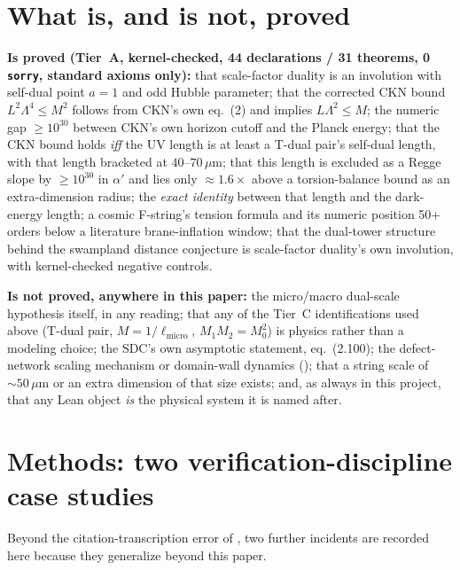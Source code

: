 \documentclass[11pt,a4paper]{article}
\theoremstyle{remark}
\begin{document}
\section{What is, and is not, proved}
\label{sec:scope}
\begin{scopebox}
\textbf{Is proved (Tier~A, kernel-checked, 44 declarations / 31 theorems, 0 \texttt{sorry},
standard axioms only):} that scale-factor duality is an involution with self-dual point $a=1$ and
odd Hubble parameter; that the corrected CKN bound $L^2\Lambda^4\le M^2$ follows from CKN's own
eq.~(2) and implies $L\Lambda^2\le M$; the numeric gap $\ge10^{30}$ between CKN's own horizon
cutoff and the Planck energy; that the CKN bound holds \emph{iff} the UV length is at least a
T-dual pair's self-dual length, with that length bracketed at $40$--$70\,\mu$m; that this length
is excluded as a Regge slope by $\ge10^{30}$ in $\alpha'$ and lies only $\approx1.6\times$ above a
torsion-balance bound as an extra-dimension radius; the \emph{exact identity} between that length
and the dark-energy length; a cosmic F-string's tension formula and its numeric position 50+ orders
below a literature brane-inflation window; that the dual-tower structure behind the swampland
distance conjecture is scale-factor duality's own involution, with kernel-checked negative
controls.

\textbf{Is not proved, anywhere in this paper:} the micro/macro dual-scale hypothesis itself, in
any reading; that any of the Tier~C identifications used above (T-dual pair, $M=1/\ell_{\mathrm{micro}}$,
$M_1M_2=M_0^2$) is physics rather than a modeling choice; the SDC's own asymptotic statement,
eq.~(2.100); the defect-network scaling mechanism or domain-wall dynamics ();
that a string scale of $\sim50\,\mu$m or an extra dimension of that size exists; and, as always in
this project, that any Lean object \emph{is} the physical system it is named after.
\end{scopebox}

\section{Methods: two verification-discipline case studies}
\label{sec:methods}
Beyond the citation-transcription error of , two further incidents are recorded here
because they generalize beyond this paper.
\end{document}
